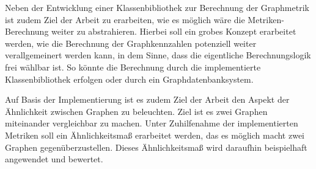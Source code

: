 \documentclass[a4paper,12pt,ngerman,chapterprefix=false,listof=totoc,bibliography=totoc]{scrreprt}
\begin{document}
{Neben der Entwicklung einer Klassenbibliothek zur Berechnung der Graphmetrik ist zudem Ziel der Arbeit zu erarbeiten, wie es möglich wäre die Metriken-Berechnung weiter zu abstrahieren. Hierbei soll ein grobes Konzept erarbeitet werden, wie die Berechnung der Graphkennzahlen potenziell weiter verallgemeinert werden kann, in dem Sinne, dass die eigentliche Berechnungslogik frei wählbar ist. So könnte die Berechnung durch die implementierte Klassenbibliothek erfolgen oder durch ein Graphdatenbanksystem.

Auf Basis der Implementierung ist es zudem Ziel der Arbeit den Aspekt der Ähnlichkeit zwischen Graphen zu beleuchten. Ziel ist es zwei Graphen miteinander vergleichbar zu machen. Unter Zuhilfenahme der implementierten Metriken soll ein Ähnlichkeitsmaß erarbeitet werden, das es möglich macht zwei Graphen gegenüberzustellen. Dieses Ähnlichkeitsmaß wird daraufhin beispielhaft angewendet und bewertet.
}
\end{document}
